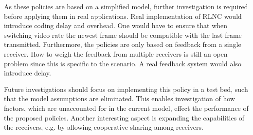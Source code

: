 %
As these policies are based on a simplified model, further investigation is required before applying them in real applications. Real implementation of RLNC would introduce coding delay and overhead. One would have to ensure that when switching video rate the newest frame should be compatible with the last frame transmitted. Furthermore, the policies are only based on feedback from a single receiver. How to weigh the feedback from multiple receivers is still an open problem since this is specific to the scenario. A real feedback system would also introduce delay.%

	Future investigations should focus on implementing this policy in a test bed, such that the model assumptions are eliminated. This enables investigation of how factors, which are unaccounted for in the current model, effect the performance of the proposed policies. Another interesting aspect is expanding the capabilities of the receivers, e.g. by allowing cooperative sharing among receivers.



